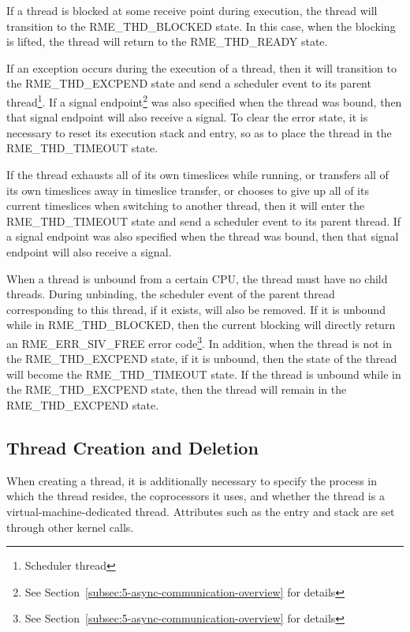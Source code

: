 If a thread is blocked at some receive point during execution, the thread will transition to the RME\_THD\_BLOCKED state. In this case, when the blocking is lifted, the thread will return to the RME\_THD\_READY state.

If an exception occurs during the execution of a thread, then it will transition to the RME\_THD\_EXCPEND state and send a scheduler event to its parent thread\footnote{Scheduler thread}. If a signal endpoint\footnote{See Section~\ref{subsec:5-async-communication-overview} for details} was also specified when the thread was bound, then that signal endpoint will also receive a signal. To clear the error state, it is necessary to reset its execution stack and entry, so as to place the thread in the RME\_THD\_TIMEOUT state.

If the thread exhausts all of its own timeslices while running, or transfers all of its own timeslices away in timeslice transfer, or chooses to give up all of its current timeslices when switching to another thread, then it will enter the RME\_THD\_TIMEOUT state and send a scheduler event to its parent thread. If a signal endpoint was also specified when the thread was bound, then that signal endpoint will also receive a signal.

When a thread is unbound from a certain CPU, the thread must have no child threads. During unbinding, the scheduler event of the parent thread corresponding to this thread, if it exists, will also be removed. If it is unbound while in RME\_THD\_BLOCKED, then the current blocking will directly return an RME\_ERR\_SIV\_FREE error code\footnote{See Section~\ref{subsec:5-async-communication-overview} for details}. In addition, when the thread is not in the RME\_THD\_EXCPEND state, if it is unbound, then the state of the thread will become the RME\_THD\_TIMEOUT state. If the thread is unbound while in the RME\_THD\_EXCPEND state, then the thread will remain in the RME\_THD\_EXCPEND state.

\subsection{Thread Creation and Deletion}\label{subsec:4-thread-creation-and-deletion}

When creating a thread, it is additionally necessary to specify the process in which the thread resides, the coprocessors it uses, and whether the thread is a virtual-machine-dedicated thread. Attributes such as the entry and stack are set through other kernel calls.

